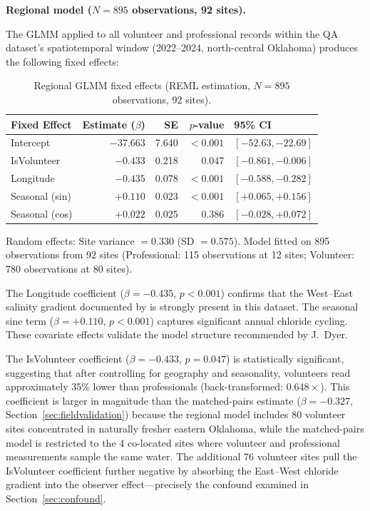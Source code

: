 \documentclass[lineno]{wlpeerj}
\begin{document}
\textbf{Regional model ($N=895$ observations, 92 sites).}

The GLMM applied to all volunteer and professional records within the QA dataset's spatiotemporal window (2022--2024, north-central Oklahoma) produces the following fixed effects:

\begin{table}[ht]
\centering
\caption{Regional GLMM fixed effects (REML estimation, $N=895$ observations, 92 sites).}
\label{tab:regionallme}
\begin{tabular}{l r r r l}
\toprule
Fixed Effect & Estimate ($\beta$) & SE & $p$-value & 95\% CI \\
\midrule
Intercept & $-37.663$ & 7.640 & $< 0.001$ & $[-52.63, -22.69]$ \\
IsVolunteer & $-0.433$ & 0.218 & 0.047 & $[-0.861, -0.006]$ \\
Longitude & $-0.435$ & 0.078 & $< 0.001$ & $[-0.588, -0.282]$ \\
Seasonal (sin) & $+0.110$ & 0.023 & $< 0.001$ & $[+0.065, +0.156]$ \\
Seasonal (cos) & $+0.022$ & 0.025 & 0.386 & $[-0.028, +0.072]$ \\
\bottomrule
\end{tabular}
\end{table}

Random effects: Site variance $= 0.330$ (SD $= 0.575$). Model fitted on 895 observations from 92 sites (Professional: 115 observations at 12 sites; Volunteer: 780 observations at 80 sites).

The Longitude coefficient ($\beta = -0.435$, $p < 0.001$) confirms that the West--East salinity gradient documented by \citet{Dyer2025} is strongly present in this dataset. The seasonal sine term ($\beta = +0.110$, $p < 0.001$) captures significant annual chloride cycling. These covariate effects validate the model structure recommended by J.\ Dyer.

The IsVolunteer coefficient ($\beta = -0.433$, $p = 0.047$) is statistically significant, suggesting that after controlling for geography and seasonality, volunteers read approximately 35\% lower than professionals (back-transformed: $0.648\times$). This coefficient is larger in magnitude than the matched-pairs estimate ($\beta = -0.327$, Section~\ref{sec:fieldvalidation}) because the regional model includes 80 volunteer sites concentrated in naturally fresher eastern Oklahoma, while the matched-pairs model is restricted to the 4 co-located sites where volunteer and professional measurements sample the same water. The additional 76 volunteer sites pull the IsVolunteer coefficient further negative by absorbing the East--West chloride gradient into the observer effect---precisely the confound examined in Section~\ref{sec:confound}.
\end{document}
